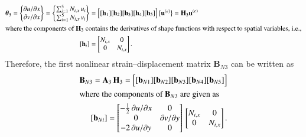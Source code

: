 \begin{subequations}
	\begin{align}
		\boldsymbol{\theta}_3 =  \begin{Bmatrix}
			\partial u / \partial x\\
			\partial v / \partial x
		\end{Bmatrix}
		= \begin{Bmatrix}
			\sum\nolimits_{i=1}^5 N_{i,x} \, u_i\\
			\sum\nolimits_{i=1}^5 N_{i,x} \, v_i
		\end{Bmatrix} 
		& = \begin{bmatrix}
			[\mathbf{h}_1] [\mathbf{h}_2] [\mathbf{h}_3] [\mathbf{h}_4] [\mathbf{h}_5] 
		\end{bmatrix} \bigl\{ \begin{matrix} \mathbf{u}^{(e)} \end{matrix} \bigr\} 
		= \mathbf{H}_3  \mathbf{u}^{(e)} \\
		\intertext{where the components of $\mathbf{H}_3$ contains the derivatives of shape functions with respect to spatial variables, i.e.,}
		[\mathbf{h}_i] & = \begin{bmatrix}
			N_{i,x} &  0  \\
			0 & N_{i,x}  \end{bmatrix} .
	\end{align}
\end{subequations}
\normalsize 
Therefore, the first nonlinear strain--displacement matrix $\mathbf{B}_{N3}$ can be written as
\begin{subequations}
	\begin{align}
		\mathbf{B}_{N3} = \mathbf{A}_3 \, \mathbf{H}_3 = \begin{bmatrix}
			[\mathbf{b}_{N1}] [\mathbf{b}_{N2}] [\mathbf{b}_{N3}] [\mathbf{b}_{N4}] [\mathbf{b}_{N5}] 
		\end{bmatrix}  \\
		\intertext{where the components of $\mathbf{B}_{N3}$ are given as}
		[\mathbf{b}_{Ni}] = \begin{bmatrix}
			-\tfrac{1}{2} \, \partial u / \partial x &  0 \\
			0 &  \partial v / \partial y \\
			-2 \, \partial u / \partial y  & 0  \end{bmatrix}  \, \begin{bmatrix}
			N_{i,x} &  0  \\
			0 & N_{i,x}  \end{bmatrix}.
	\end{align}
\end{subequations}

